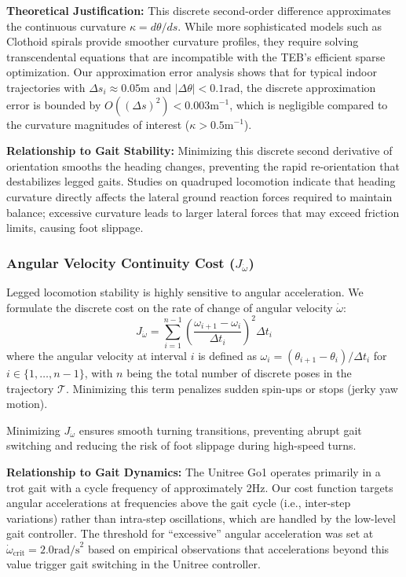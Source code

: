 \documentclass[lettersize,journal]{IEEEtran}
\begin{document}
\textbf{Theoretical Justification:} This discrete second-order difference approximates the continuous curvature $\kappa = d\theta/ds$. While more sophisticated models such as Clothoid spirals provide smoother curvature profiles, they require solving transcendental equations that are incompatible with the TEB's efficient sparse optimization. Our approximation error analysis shows that for typical indoor trajectories with $\Delta s_i \approx 0.05\text{m}$ and $|\Delta\theta| < 0.1\text{rad}$, the discrete approximation error is bounded by $O((\Delta s)^2) < 0.003\text{m}^{-1}$, which is negligible compared to the curvature magnitudes of interest ($\kappa > 0.5\text{m}^{-1}$).

\textbf{Relationship to Gait Stability:} Minimizing this discrete second derivative of orientation smooths the heading changes, preventing the rapid re-orientation that destabilizes legged gaits. Studies on quadruped locomotion \cite{wensingOptimizationBasedControlDynamic2024} indicate that heading curvature directly affects the lateral ground reaction forces required to maintain balance; excessive curvature leads to larger lateral forces that may exceed friction limits, causing foot slippage.

\subsubsection{Angular Velocity Continuity Cost ($J_{\dot{\omega}}$)}
Legged locomotion stability is highly sensitive to angular acceleration. We formulate the discrete cost on the rate of change of angular velocity $\dot{\omega}$:
\begin{equation}
J_{\dot{\omega}} = \sum_{i=1}^{n-1} \left( \frac{\omega_{i+1} - \omega_i}{\Delta t_i} \right)^2 \Delta t_i
\end{equation}
where the angular velocity at interval $i$ is defined as $\omega_i = (\theta_{i+1} - \theta_i) / \Delta t_i$ for $i \in \{1, \ldots, n-1\}$, with $n$ being the total number of discrete poses in the trajectory $\mathcal{T}$. Minimizing this term penalizes sudden spin-ups or stops (jerky yaw motion).

Minimizing $J_{\dot{\omega}}$ ensures smooth turning transitions, preventing abrupt gait switching and reducing the risk of foot slippage during high-speed turns.

\textbf{Relationship to Gait Dynamics:} The Unitree Go1 operates primarily in a trot gait with a cycle frequency of approximately 2Hz. Our cost function targets angular accelerations at frequencies above the gait cycle (i.e., inter-step variations) rather than intra-step oscillations, which are handled by the low-level gait controller. The threshold for ``excessive'' angular acceleration was set at $\dot{\omega}_{\text{crit}} = 2.0\text{rad/s}^2$ based on empirical observations that accelerations beyond this value trigger gait switching in the Unitree controller.
\end{document}

